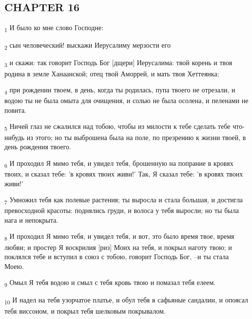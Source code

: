 \subsection{CHAPTER 16}
\begin{tcolorbox}
\textsubscript{1} И было ко мне слово Господне:
\end{tcolorbox}
\begin{tcolorbox}
\textsubscript{2} сын человеческий! выскажи Иерусалиму мерзости его
\end{tcolorbox}
\begin{tcolorbox}
\textsubscript{3} и скажи: так говорит Господь Бог [дщери] Иерусалима: твой корень и твоя родина в земле Ханаанской; отец твой Аморрей, и мать твоя Хеттеянка;
\end{tcolorbox}
\begin{tcolorbox}
\textsubscript{4} при рождении твоем, в день, когда ты родилась, пупа твоего не отрезали, и водою ты не была омыта для очищения, и солью не была осолена, и пеленами не повита.
\end{tcolorbox}
\begin{tcolorbox}
\textsubscript{5} Ничей глаз не сжалился над тобою, чтобы из милости к тебе сделать тебе что-нибудь из этого; но ты выброшена была на поле, по презрению к жизни твоей, в день рождения твоего.
\end{tcolorbox}
\begin{tcolorbox}
\textsubscript{6} И проходил Я мимо тебя, и увидел тебя, брошенную на попрание в кровях твоих, и сказал тебе: 'в кровях твоих живи!' Так, Я сказал тебе: 'в кровях твоих живи!'
\end{tcolorbox}
\begin{tcolorbox}
\textsubscript{7} Умножил тебя как полевые растения; ты выросла и стала большая, и достигла превосходной красоты: поднялись груди, и волоса у тебя выросли; но ты была нага и непокрыта.
\end{tcolorbox}
\begin{tcolorbox}
\textsubscript{8} И проходил Я мимо тебя, и увидел тебя, и вот, это было время твое, время любви; и простер Я воскрилия [риз] Моих на тебя, и покрыл наготу твою; и поклялся тебе и вступил в союз с тобою, говорит Господь Бог, --и ты стала Моею.
\end{tcolorbox}
\begin{tcolorbox}
\textsubscript{9} Омыл Я тебя водою и смыл с тебя кровь твою и помазал тебя елеем.
\end{tcolorbox}
\begin{tcolorbox}
\textsubscript{10} И надел на тебя узорчатое платье, и обул тебя в сафьяные сандалии, и опоясал тебя виссоном, и покрыл тебя шелковым покрывалом.
\end{tcolorbox}
